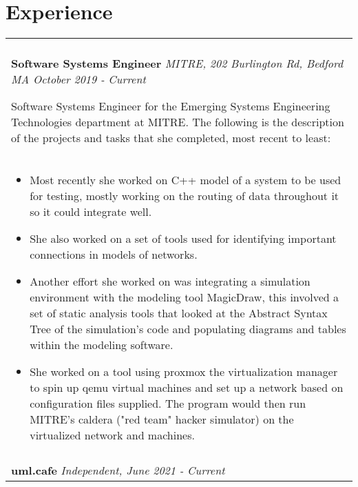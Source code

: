 \documentclass[11pt]{article}
\begin{document}
\section*{Experience}
\begin{tabular}{p{18.5cm}}
    \hline
    \multicolumn{1}{c}{} \\

    \large \textbf{Software Systems Engineer} \normalsize \textit{MITRE, 202 Burlington Rd, Bedford MA \hfill October 2019 - Current}

    \> Software Systems Engineer for the Emerging Systems Engineering Technologies department at MITRE. The following is the 
    description of the projects and tasks that she completed, most recent to least:\\ 

    \begin{itemize}[noitemsep,topsep=0pt]
      \item Most recently she worked on C++ model of a system to be used for testing, mostly working on the routing of data 
      throughout it so it could integrate well.
      \item She also worked on a set of tools used for identifying important connections in models of networks.
      \item Another effort she worked on was integrating a simulation environment with the modeling tool MagicDraw, this involved 
      a set of static analysis tools that looked at the Abstract Syntax Tree of the simulation's code and populating diagrams and 
      tables within the modeling software.
      \item She worked on a tool using proxmox the virtualization manager to spin up qemu virtual machines and 
      set up a network based on configuration files supplied. The program would then run MITRE's caldera ("red team" hacker simulator) on 
      the virtualized network and machines.
    \end{itemize}\\

    \multicolumn{1}{c}{} \\

    \large \textbf{uml.cafe} \normalsize \textit{Independent, \hfill June 2021 - Current}


\end{tabular}
\end{document}
